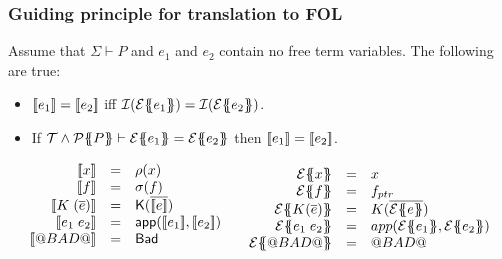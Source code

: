 \documentclass[serif,professionalfont]{beamer}
\begin{document}
\begin{frame}[fragile]
  \frametitle{Guiding principle for translation to FOL}

  \begin{theorem}
  Assume that $\Sigma \vdash P$ and $e_1$ and $e_2$ contain no free term variables. The following
  are true:
  \begin{itemize}
    \item $[\![e_1]\!] = [\![e_2]\!]$ iff ${\cal I}(\etrans{}{}{e_1}) = {\cal I}(\etrans{}{}{e_2})$.
    \item If $\Th \land \ptrans{\Sigma}{P} \vdash \etrans{}{}{e_1} = \etrans{}{}{e_2}$ then $[\![e_1]\!] = [\![e_2]\!]$.
  \end{itemize}
  \end{theorem}
  \[\begin{array}{cc}

    \begin{array}{rcl}
      \interp{x}{\sigma}{\rho}                    & {=} & \rho(x) \\
      \interp{f}{\sigma}{\rho}           & {=} & \sigma(f) \\
      \interp{K\;(\ol{e})}{\sigma}{\rho} & {=} & \roll{\ret{\injK{K}{\ol{\interp{e}{\sigma}{\rho}}}}} \\
      \interp{e_1\;e_2}{\sigma}{\rho}             & {=} & \dapp(\interp{e_1}{\sigma}{\rho}, \interp{e_2}{\sigma}{\rho}) \\
      \interp{@BAD@}{\sigma}{\rho}                & {=} & \roll{\ret{\injBad}} \\[2mm]
    \end{array}

    &

    \begin{array}{rcl}
    \etrans{\Sigma}{\Gamma}{x}                    & {=} & \formula{x} \\
    \etrans{\Sigma}{\Gamma}{f}         & {=} & \formula{f_{ptr}} \\
    \etrans{\Sigma}{\Gamma}{K(\ol{e})} & {=} & \formula{K(\ol{\etrans{\Sigma}{\Gamma}{e}})} \\
    \etrans{\Sigma}{\Gamma}{e_1\;e_2}             & {=} & \formula{app(\etrans{\Sigma}{\Gamma}{e_1},
                                                           \etrans{\Sigma}{\Gamma}{e_2})} \\
    \etrans{\Sigma}{\Gamma}{@BAD@}                & {=} & \formula{\bad}
    \end{array}

  \end{array}\]

\end{frame}
\end{document}
